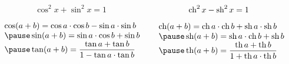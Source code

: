 \begin{frame}
\begin{columns}%
\begin{column}{2cm}
  
\end{column}

\begin{column}{6cm}
$$\cos^2 x + \sin^2 x = 1$$


\pause

$$\begin{array}{l@{\vrule depth 1.2ex height 5ex width 0mm }}
\cos(a+b)=\cos a\cdot\cos b - \sin a\cdot\sin b\\
\pause
\sin(a+b)=\sin a\cdot\cos b  +  \sin b\cdot\cos a \\
\pause
\displaystyle \tan (a+b)=\frac{\tan a + \tan b}{1-\tan a\cdot\tan b} \\
\end{array} $$
\end{column}
\pause
\begin{column}{6cm}
$$\mathop{\text{ch}}\nolimits^2 x - \mathop{\text{sh}}\nolimits^2 x = 1$$

\pause

$$\begin{array}{l@{\vrule depth 1.2ex height 5ex width 0mm }}
\ch(a+b)=\ch a\cdot\ch b + \sh a\cdot\sh b\\
\pause
\sh(a+b)=\sh a\cdot\ch b  +  \sh b\cdot\ch a\\
\pause
\displaystyle \tanh (a+b)=\frac{\tanh a + \tanh b}{1+\tanh a\cdot\tanh b}\\
\end{array}   $$ 
\end{column}

\end{columns}



\end{frame}



